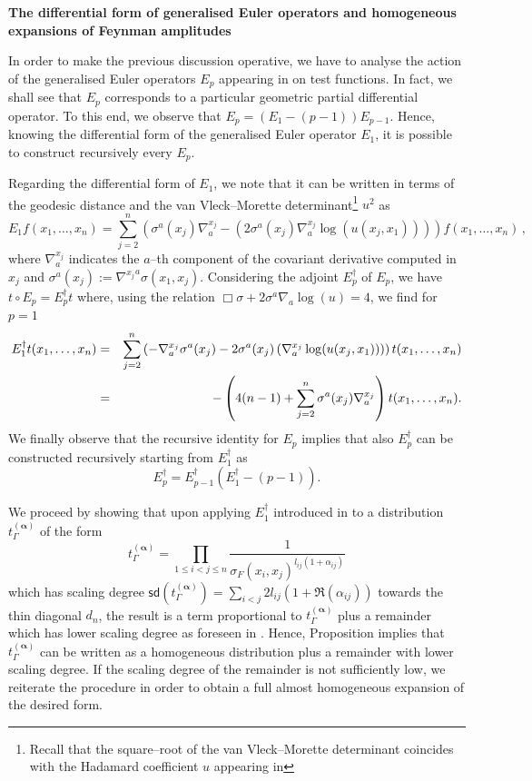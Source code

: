 \documentclass[10pt]{book}
\newcommand{\sd}{\mathsf{sd}}
\theoremstyle{break}
\begin{document}
\bigskip

\bigskip

\textbf{The differential form of generalised Euler operators and homogeneous expansions of Feynman amplitudes}

\bigskip

In order to make the previous discussion operative, we have to analyse the action of the generalised Euler operators $E_p$ appearing in %
on test functions. In fact, we shall see that $E_p$ corresponds to a particular geometric partial differential operator. To this end, we observe that $E_p = (E_1-(p-1)) E_{p-1}$. Hence, knowing the differential form of the generalised Euler operator $E_1$, it is possible to construct recursively every $E_p$.

Regarding the differential form of $E_1$, we note that it can be written in terms of the geodesic distance and the van Vleck--Morette determinant\footnote{Recall that the square--root of the van Vleck--Morette determinant coincides with the Hadamard coefficient $u$ appearing in %
} 
$u^2$  as 
\[
E_1 f(x_1, \dots, x_n) = \sum_{j=2}^n \left(\sigma^a(x_j) \nabla^{x_j}_a  - \left(2  \sigma^a(x_j) \nabla^{x_j}_a  \log (u(x_j,x_1))\right)\right) f(x_1, \dots, x_n)\,,
\]
where $\nabla^{x_j}_a$ indicates the $a$--th component of the covariant derivative computed in $x_j$ and 
$\sigma^a(x_j) := {\nabla^{x_j}}^a\sigma(x_1,x_j)$.
Considering the adjoint $E^\dagger_p$ of $E_p$, we have $t\circ E_p = E^\dagger_p t$ where, using the relation $\Box \sigma + 2\sigma^a\nabla_a \log (u) = 4$, we find for $p=1$
%
\begin{eqnarray*}
E_1^\dagger  t(x_1,\dots,x_n)     
&=&  \sum_{j=2}^n \left(- \nabla^{x_j}_a \sigma^a(x_j)    - 2 \sigma^a(x_j) \left(\nabla^{x_j}_a \log (u(x_j,x_1)) \right)\right) t(x_1,\dots,x_n) \notag \\
&=& -\left( 4(n-1) +  \sum_{j=2}^n \sigma^a(x_j) \nabla^{x_j}_a   \right)t(x_1,\dots,x_n).
\end{eqnarray*}
%
We finally observe that the recursive identity for $E_p$ implies that also $E^\dagger_p$ can be constructed recursively starting from $E^\dagger_1$ as 
\[
E_p^\dagger =  E_{p-1}^\dagger (E_1^\dagger-(p-1)).
\]

We proceed by showing that upon applying $E^\dagger_1$ introduced in  %
to a distribution $t_\Gamma^{(\boldsymbol{\alpha})}$ of the form
\[
t_\Gamma^{(\boldsymbol{\alpha})}=\prod_{1\leq i < j \leq n } \frac{1}{\sigma_F(x_i,x_j)^{l_{ij}(1+ \alpha_{ij})}}
\]
which has scaling degree $\sd(t_\Gamma^{(\boldsymbol{\alpha})}) = \sum_{i<j} 2 l_{ij}(1+ \Re(\alpha_{ij}))$ towards the thin diagonal $d_n$, the result is a term proportional to $t_\Gamma^{(\boldsymbol{\alpha})}$ plus a remainder which has lower scaling degree as foreseen in %
. Hence, Proposition %
implies that $t_\Gamma^{(\boldsymbol{\alpha})}$ can be written as a homogeneous distribution plus a remainder with lower scaling degree. If the scaling degree of the remainder is not sufficiently low, we reiterate the procedure in order to obtain a full almost homogeneous expansion of the desired form.
\end{document}

